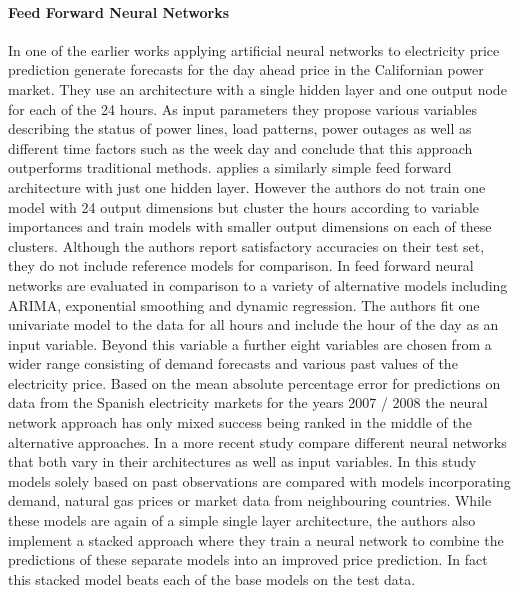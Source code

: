 \paragraph{Feed Forward Neural Networks}
In one of the earlier works applying artificial neural networks to electricity price prediction \cite{yamin_adaptive_2004} generate forecasts for the day ahead price in the Californian power market. They use an architecture with a single hidden layer and one output node for each of the 24 hours. As input parameters they propose various variables describing the status of power lines, load patterns, power outages as well as different time factors such as the week day and conclude that this approach outperforms traditional methods. 
\cite{gareta_forecasting_2006} applies a similarly simple feed forward architecture with just one hidden layer. However the authors do not train one model with 24 output dimensions but cluster the hours according to variable importances and train models with smaller output dimensions on each of these clusters. Although the authors report satisfactory accuracies on their test set, they do not include reference models for comparison. In \cite{cruz_effect_2011} feed forward neural networks are evaluated in comparison to a variety of alternative models including ARIMA, exponential smoothing and dynamic regression. The authors fit one univariate model to the data for all hours and include the hour of the day as an input variable. Beyond this variable a further eight variables are chosen from a wider range consisting of demand forecasts and various past values of the electricity price. Based on the mean absolute percentage error for predictions on data from the Spanish electricity markets for the years 2007 / 2008 the neural network approach has only mixed success being ranked in the middle of the alternative approaches. In a more recent study \cite{panapakidis_day-ahead_2016} compare different neural networks that both vary in their architectures as well as input variables. In this study models solely based on past observations are compared with models incorporating demand, natural gas prices or market data from neighbouring countries. While these models are again of a simple single layer architecture, the authors also implement a stacked approach where they train a neural network to combine the predictions of these separate models into an improved price prediction. In fact this stacked model beats each of the base models on the test data. 

